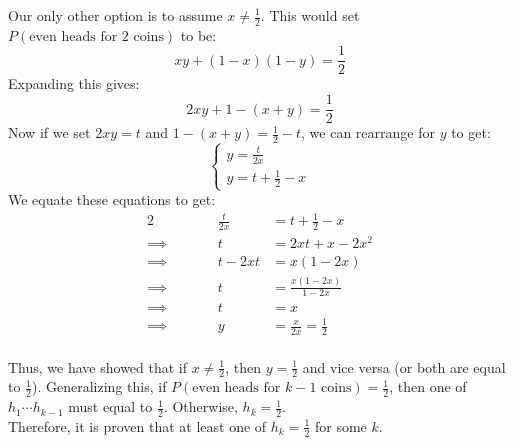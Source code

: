 \documentclass[11pt]{article}
\begin{document}
\noindent Our only other option is to assume $x \neq \frac{1}{2}$. This would set $P(\text{even heads for 2 coins})$ to be:
\begin{equation*}
    xy + (1-x)(1-y) = \frac{1}{2}
\end{equation*}
Expanding this gives:
\begin{equation*}
    2xy + 1 - (x+y) = \frac{1}{2}
\end{equation*}
Now if we set $2xy = t$ and $1 - (x+y) = \frac{1}{2} - t$, we can rearrange for $y$ to get:
\begin{equation*}
    \begin{cases}
        y = \frac{t}{2x} \\
        y = t + \frac{1}{2} - x
    \end{cases}
\end{equation*}
We equate these equations to get:
\begin{alignat*}{2}
    \qquad & &\frac{t}{2x} &= t + \frac{1}{2} - x \\
    \implies \qquad & &t &= 2xt + x - 2x^2 \\
    \implies \qquad & &t - 2xt &= x(1-2x) \\
    \implies \qquad & &t &= \frac{x(1-2x)}{1-2x} \\
    \implies \qquad & &t &= x \\
    \implies \qquad & &y &= \frac{x}{2x} = \frac{1}{2}
\end{alignat*} \\

\noindent Thus, we have showed that if $x \neq \frac{1}{2}$, then $y = \frac{1}{2}$ and vice versa (or both are equal to $\frac{1}{2}$). Generalizing this, if $P(\text{even heads for $k-1$ coins}) = \frac{1}{2}$, then one of $h_1 \cdots h_{k-1}$ must equal to $\frac{1}{2}$. Otherwise, $h_k = \frac{1}{2}$. \\

\noindent Therefore, it is proven that at least one of $h_k = \frac{1}{2}$ for some $k$.
\end{document}
